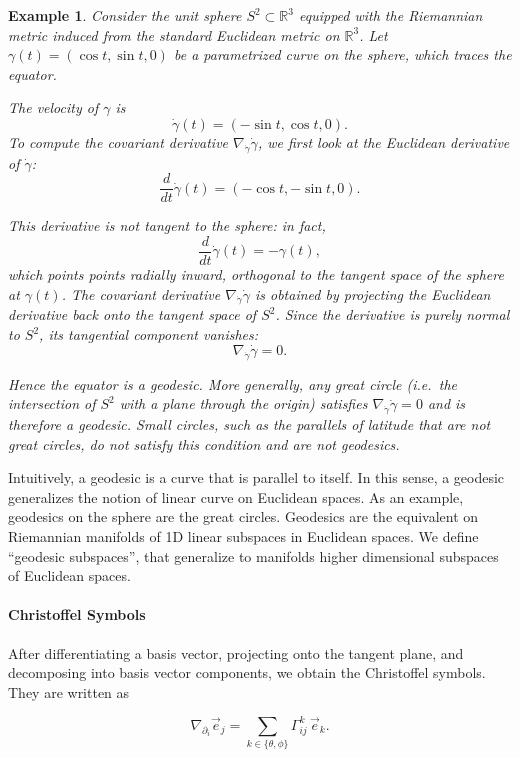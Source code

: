 \documentclass{article}
\newtheorem{example}{Example}
\begin{document}
\begin{example}
Consider the unit sphere $S^2 \subset \mathbb{R}^3$ equipped with the Riemannian metric induced from the standard Euclidean metric on $\mathbb{R}^3$.
Let $\gamma(t) = (\cos t, \sin t, 0)$ be a parametrized curve on the sphere, which traces the equator.

The velocity of $\gamma$ is
\[
\dot{\gamma}(t) = (-\sin t, \cos t, 0).
\]
To compute the covariant derivative $\nabla_{\dot{\gamma}} \dot{\gamma}$, we first look at the Euclidean derivative of $\dot{\gamma}$:
\[
\frac{d}{dt}\dot{\gamma}(t) = (-\cos t, -\sin t, 0).
\]

This derivative is not tangent to the sphere: in fact,
\[
\frac{d}{dt}\dot{\gamma}(t) = -\gamma(t),
\]
which points points radially inward, orthogonal to the tangent space of the sphere at $\gamma(t)$. The covariant derivative $\nabla_{\dot{\gamma}} \dot{\gamma}$ is obtained by projecting the Euclidean derivative back onto the tangent space of $S^2$.
Since the derivative is purely normal to $S^2$, its tangential component vanishes:
\[
\nabla_{\dot{\gamma}} \dot{\gamma} = 0.
\]

Hence the equator is a geodesic. More generally, any great circle (i.e.\ the intersection of $S^2$ with a plane through the origin)
satisfies $\nabla_{\dot{\gamma}} \dot{\gamma}=0$ and is therefore a geodesic. Small circles, such as the parallels of latitude that are not great circles, do not satisfy this condition and are not geodesics.
\end{example}

Intuitively, a geodesic is a curve that is parallel to itself. In this sense, a geodesic generalizes the notion of linear
curve on Euclidean spaces. As an example, geodesics on the sphere are the great circles. Geodesics are the equivalent on Riemannian manifolds
of 1D linear subspaces in Euclidean spaces. We define “geodesic subspaces”, that generalize to manifolds higher dimensional
subspaces of Euclidean spaces.

\paragraph{Christoffel Symbols} 
After differentiating a basis vector, projecting onto the tangent plane, and decomposing into basis vector components, we obtain the Christoffel symbols. They are written as

\[
\nabla_{\partial_i} \vec{e}_j 
= \sum_{k \in \{\theta,\phi\}} \Gamma^k_{ij}\,\vec{e}_k.
\]
\end{document}
